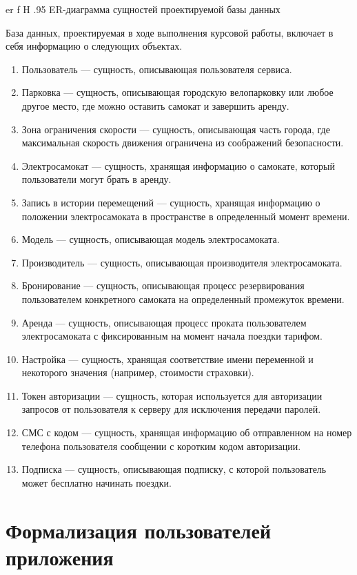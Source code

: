 {er}
{f}
{H}
{.95\textwidth}
{ER-диаграмма сущностей проектируемой базы данных}

База данных, проектируемая в ходе выполнения курсовой работы, включает в себя информацию о следующих объектах.

\begin{enumerate}
	\item Пользователь --- сущность, описывающая пользователя сервиса.
	\item Парковка --- сущность, описывающая городскую велопарковку или любое другое место, где можно оставить самокат и завершить аренду.
	\item Зона ограничения скорости --- сущность, описывающая часть города, где максимальная скорость движения ограничена из соображений безопасности.
	\item Электросамокат --- сущность, хранящая информацию о самокате, который пользователи могут брать в аренду.
	\item Запись в истории перемещений --- сущность, хранящая информацию о положении электросамоката в пространстве в определенный момент времени.
	\item Модель --- сущность, описывающая модель электросамоката.
	\item Производитель --- сущность, описывающая производителя электросамоката.
	\item Бронирование --- сущность, описывающая процесс резервирования пользователем конкретного самоката на определенный промежуток времени.
	\item Аренда --- сущность, описывающая процесс проката пользователем электросамоката с фиксированным на момент начала поездки тарифом.
	\item Настройка --- сущность, хранящая соответствие имени переменной и некоторого значения (например, стоимости страховки).
	\item Токен авторизации --- сущность, которая используется для авторизации запросов от пользователя к серверу для исключения передачи паролей.
	\item СМС с кодом --- сущность, хранящая информацию об отправленном на номер телефона пользователя сообщении с коротким кодом авторизации.
	\item Подписка --- сущность, описывающая подписку, с которой пользователь может бесплатно начинать поездки.
\end{enumerate}

\section{Формализация пользователей приложения}

